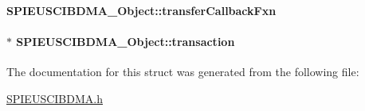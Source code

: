 \paragraph[{transfer\+Callback\+Fxn}]{ S\+P\+I\+E\+U\+S\+C\+I\+B\+D\+M\+A\+\_\+\+Object\+::transfer\+Callback\+Fxn}\label{struct_s_p_i_e_u_s_c_i_b_d_m_a___object_a1a5d8467541e90687b6c9034e45dfe75}
\paragraph[{transaction}]{$\ast$ S\+P\+I\+E\+U\+S\+C\+I\+B\+D\+M\+A\+\_\+\+Object\+::transaction}\label{struct_s_p_i_e_u_s_c_i_b_d_m_a___object_a4b218a6096bec10cc51eeb6597ac9f8c}


The documentation for this struct was generated from the following file\+:\begin{DoxyCompactItemize}
\item 
\hyperlink{_s_p_i_e_u_s_c_i_b_d_m_a_8h}{S\+P\+I\+E\+U\+S\+C\+I\+B\+D\+M\+A.\+h}\end{DoxyCompactItemize}
